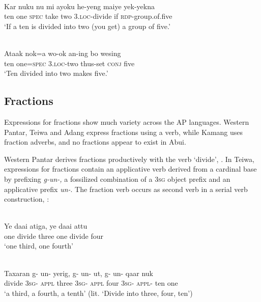 \ea%
\label{bkm:Ref358116296}
\\
\gll  Kar  nuku  nu  mi  ayoku  he-yeng  maiye  yek-yekna \\  
    ten  one  \textsc{spec}  take  two  3.\textsc{loc-}divide  if  \textsc{rdp-}group.of.five \\
\glt  `If a ten is divided into two (you get) a group of five.'
\z



 




\ea
\label{ex:8:1247}
\\
 \gll Ataak  nok=a  wo-ok  an-ing  bo  wesing \\
  ten  one=\textsc{spec}  \textsc{3.loc}-two  thus-set  \textsc{conj}  five \\
 \glt`Ten divided into two makes five.'
\z


\subsection{Fractions}
\label{sec:8:Fractions}
Expressions for fractions show much variety across the AP languages. Western Pantar, Teiwa and Adang express fractions using a verb, while Kamang uses fraction adverbs, and no fractions appear to exist in Abui. 

Western Pantar derives fractions productively with the verb `divide', . In Teiwa, expressions for fractions contain an applicative verb derived from a cardinal base by prefixing \textit{g-un-,} a fossilized combination of a 3\textsc{sg} object prefix and an applicative prefix \textit{un-}. The fraction verb occurs as second verb in a serial verb construction, : 


\ea%
\label{bkm:Ref342746525}
 
\\
\gll   Ye  daai  atiga,  ye   daai  attu\\  
   one   divide  three   one  divide  four \\
\glt  `one third, one fourth'   
\z

 

\ea%
\label{bkm:Ref342746583}
\\
\gll  Taxaran  g-  un-  yerig,  g-  un-  ut,  g-  un-  qaar nuk \\  
   divide  \textsc{3sg}-  \textsc{appl} three  \textsc{3sg-}  \textsc{appl} four  \textsc{3sg-}  \textsc{appl-} ten one   \\
\glt  `a third, a fourth, a tenth' (lit. `Divide into three, four, ten')
\z



